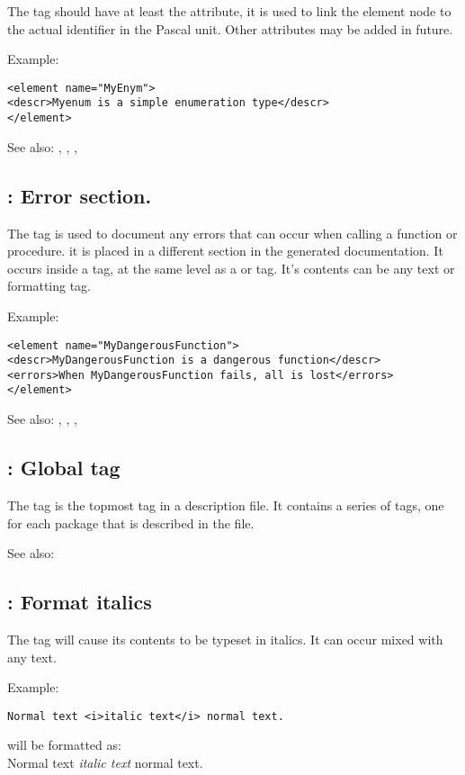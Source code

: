 The  tag should have at least the  attribute, it 
is used to link the element node to the actual identifier in the Pascal unit.
Other attributes may be added in future.

Example:
\begin{verbatim}
<element name="MyEnym">
<descr>Myenum is a simple enumeration type</descr>
</element>
\end{verbatim}

See also: , , , 

\subsection{ : Error section.}
\label{tag:errors}
The  tag is used to document any errors that can occur when
calling a function or procedure. it is placed in a different section in the
generated documentation. It occurs inside a  tag, at the same
level as a  or  tag. It's contents can be any
text or formatting tag.

Example:
\begin{verbatim}
<element name="MyDangerousFunction">
<descr>MyDangerousFunction is a dangerous function</descr>
<errors>When MyDangerousFunction fails, all is lost</errors>
</element>
\end{verbatim}

See also: , , , 

\subsection{ : Global tag}
\label{tag:fpdocdescription}
The  tag is the topmost tag in a description file. It
contains a series of  tags, one for each package that is
described in the file.

See also: 

\subsection{ : Format italics}
\label{tag:i}
The  tag will cause its contents to be typeset in italics. It can
occur mixed with any text.

Example:
\begin{verbatim}
Normal text <i>italic text</i> normal text.
\end{verbatim}
will be formatted as:\\
Normal text \textit{italic text} normal text.

